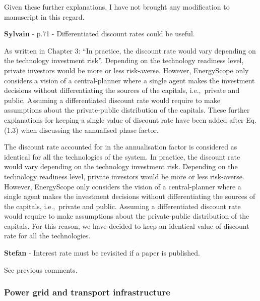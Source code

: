\documentclass[12pt,a4paper]{article}
\def\ie{i.e.,\ }
\begin{document}
Given these further explanations, I have not brought any modification to manuscript in this regard.

\begin{mdframed}[style=comment] %
{\color{purple} \textbf{Sylvain}} - p.71 - Differentiated discount rates could be useful.
\end{mdframed}

\noindent As written in Chapter 3: ``In practice, the discount rate would vary depending on the technology investment risk''. Depending on the technology readiness level, private investors would be more or less risk-averse. However, EnergyScope only considers a vision of a central-planner where a single agent makes the investment decisions without differentiating the sources of the capitals, \ie private and public. Assuming a differentiated discount rate would require to make assumptions about the private-public distribution of the capitals. These further explanations for keeping a single value of discount rate have been added {\color{blue} after Eq. (1.3) when discussing the annualised phase factor}.

\begin{mdframed}[style=manuscript] %
The discount rate accounted for in the annualisation factor is considered as identical for all the technologies of the system. In practice, the discount rate would vary depending on the technology investment risk. Depending on the technology readiness level, private investors would be more or less risk-averse. However, EnergyScope only considers the vision of a central-planner where a single agent makes the investment decisions without differentiating the sources of the capitals, \ie private and public. Assuming a differentiated discount rate would require to make assumptions about the private-public distribution of the capitals. For this reason, we have decided to keep an identical value of discount rate for all the technologies.
\end{mdframed}

\begin{mdframed}[style=comment] %
{\color{teal} \textbf{Stefan}} - Interest rate must be revisited if a paper is published.
\end{mdframed}

\noindent See previous comments.

\subsubsection{Power grid and transport infrastructure}
\end{document}

